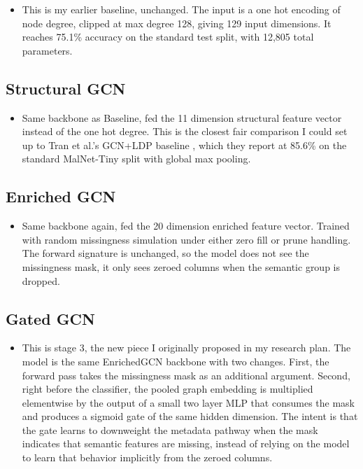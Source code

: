 \documentclass[12pt]{article}
\begin{document}
\begin{itemize}
    \item This is my earlier baseline, unchanged. The input is a one hot encoding of node degree, clipped at max degree 128, giving 129 input dimensions. It reaches 75.1\% accuracy on the standard test split, with 12,805 total parameters.
\end{itemize}

\subsection{Structural GCN}

\begin{itemize}
    \item Same backbone as Baseline, fed the 11 dimension structural feature vector instead of the one hot degree. This is the closest fair comparison I could set up to Tran et al.'s GCN+LDP baseline \cite{tran2025}, which they report at 85.6\% on the standard MalNet-Tiny split with global max pooling.
\end{itemize}

\subsection{Enriched GCN}

\begin{itemize}
    \item Same backbone again, fed the 20 dimension enriched feature vector. Trained with random missingness simulation under either zero fill or prune handling. The forward signature is unchanged, so the model does not see the missingness mask, it only sees zeroed columns when the semantic group is dropped.
\end{itemize}

\subsection{Gated GCN}

\begin{itemize}
    \item This is stage 3, the new piece I originally proposed in my research plan. The model is the same EnrichedGCN backbone with two changes. First, the forward pass takes the missingness mask as an additional argument. Second, right before the classifier, the pooled graph embedding is multiplied elementwise by the output of a small two layer MLP that consumes the mask and produces a sigmoid gate of the same hidden dimension. The intent is that the gate learns to downweight the metadata pathway when the mask indicates that semantic features are missing, instead of relying on the model to learn that behavior implicitly from the zeroed columns.
\end{itemize}
\end{document}
